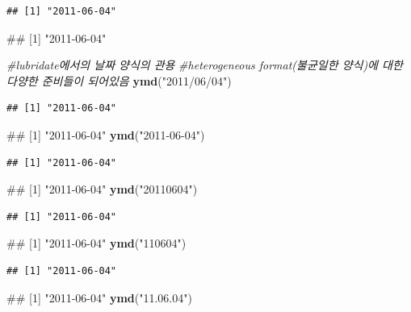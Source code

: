 \documentclass[10pt,]{krantz}
\makeatletter
\newenvironment{Shaded}{\begin{snugshade}}{\end{snugshade}}
\newcommand{\KeywordTok}[1]{\textcolor[rgb]{0.13,0.29,0.53}{\textbf{#1}}}
\newcommand{\StringTok}[1]{\textcolor[rgb]{0.31,0.60,0.02}{#1}}
\newcommand{\CommentTok}[1]{\textcolor[rgb]{0.56,0.35,0.01}{\textit{#1}}}
\newcommand{\NormalTok}[1]{#1}
\newenvironment{kframe}{%
\medskip{}
\setlength{\fboxsep}{.8em}
 \def\at@end@of@kframe{}%
 \ifinner\ifhmode%
  \def\at@end@of@kframe{\end{minipage}}%
  \begin{minipage}{\columnwidth}%
 \fi\fi%
 \def\FrameCommand##1{\hskip\@totalleftmargin \hskip-\fboxsep
 \colorbox{shadecolor}{##1}\hskip-\fboxsep
     \hskip-\linewidth \hskip-\@totalleftmargin \hskip\columnwidth}%
 \MakeFramed {\advance\hsize-\width
   \@totalleftmargin\z@ \linewidth\hsize
   \@setminipage}}%
 {\par\unskip\endMakeFramed%
 \at@end@of@kframe}
\renewenvironment{Shaded}{\begin{kframe}}{\end{kframe}}
\makeatother
\begin{document}
\begin{verbatim}
## [1] "2011-06-04"
\end{verbatim}

\begin{Shaded}
\begin{Highlighting}[]
\NormalTok{## [1] "2011-06-04"}

\CommentTok{#lubridate에서의 날짜 양식의 관용}
\CommentTok{#heterogeneous format(불균일한 양식)에 대한 다양한 준비들이 되어있음}
\KeywordTok{ymd}\NormalTok{(}\StringTok{"2011/06/04"}\NormalTok{)}
\end{Highlighting}
\end{Shaded}

\begin{verbatim}
## [1] "2011-06-04"
\end{verbatim}

\begin{Shaded}
\begin{Highlighting}[]
\NormalTok{## [1] "2011-06-04"}
\KeywordTok{ymd}\NormalTok{(}\StringTok{"2011-06-04"}\NormalTok{)}
\end{Highlighting}
\end{Shaded}

\begin{verbatim}
## [1] "2011-06-04"
\end{verbatim}

\begin{Shaded}
\begin{Highlighting}[]
\NormalTok{## [1] "2011-06-04"}
\KeywordTok{ymd}\NormalTok{(}\StringTok{"20110604"}\NormalTok{)}
\end{Highlighting}
\end{Shaded}

\begin{verbatim}
## [1] "2011-06-04"
\end{verbatim}

\begin{Shaded}
\begin{Highlighting}[]
\NormalTok{## [1] "2011-06-04"}
\KeywordTok{ymd}\NormalTok{(}\StringTok{"110604"}\NormalTok{)}
\end{Highlighting}
\end{Shaded}

\begin{verbatim}
## [1] "2011-06-04"
\end{verbatim}

\begin{Shaded}
\begin{Highlighting}[]
\NormalTok{## [1] "2011-06-04"}
\KeywordTok{ymd}\NormalTok{(}\StringTok{"11.06.04"}\NormalTok{)}
\end{Highlighting}
\end{Shaded}
\end{document}
